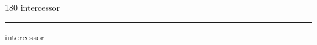 
\begin{frame}
\begin{center}
\begin{turn}{180}
{\fontsize{2.5cm}{1em}\selectfont intercessor}
\end{turn}
\vspace{1em}\par  
\hrule
\vspace{1em}\par  
{\fontsize{2.5cm}{1em}\selectfont intercessor}
\end{center}
\end{frame}
